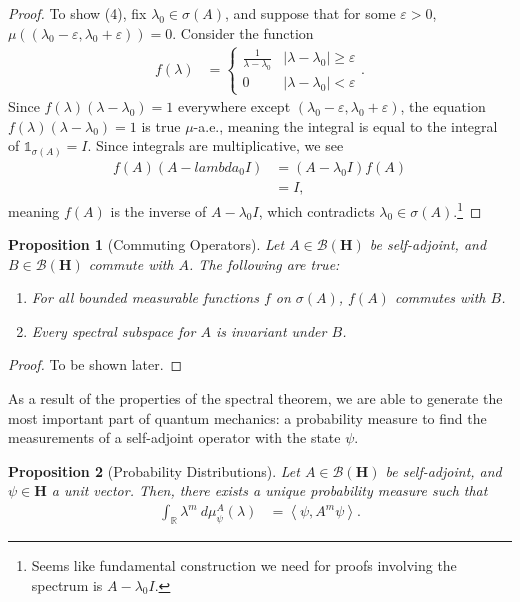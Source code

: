\documentclass[10pt]{extarticle}
\newcommand{\R}{\mathbb{R}}
\newcommand{\iprod}[2]{\left\langle #1,#2\right\rangle}
\theoremstyle{plain}
\newtheorem*{proposition}{Proposition}%
\theoremstyle{definition}
\theoremstyle{remark}
\begin{document}
\begin{proof}
    To show (4), fix $\lambda_0\in \sigma(A)$, and suppose that for some $\varepsilon > 0$, $\mu\left((\lambda_0 - \varepsilon, \lambda_0 + \varepsilon)\right) = 0$. Consider the function
    \begin{align*}
      f(\lambda) &= \begin{cases}
        \frac{1}{\lambda - \lambda_0} & \left\vert \lambda - \lambda_0 \right\vert \geq \varepsilon\\
        0 & \left\vert \lambda - \lambda_0 \right\vert < \varepsilon
      \end{cases}.
    \end{align*}
    Since $f(\lambda)\left(\lambda - \lambda_0\right) = 1$ everywhere except $(\lambda_0 - \varepsilon,\lambda_0 + \varepsilon)$, the equation $f(\lambda)\left(\lambda - \lambda_0\right) = 1$ is true $\mu$-a.e., meaning the integral is equal to the integral of $\mathbb{1}_{\sigma(A)} = I$. Since integrals are multiplicative, we see
    \begin{align*}
      f(A)\left(A - lambda_0 I\right) &= \left(A - \lambda_0 I\right)f(A)\\
                                      &= I,
    \end{align*}
    meaning $f(A)$ is the inverse of $A - \lambda_0 I$, which contradicts $\lambda_0 \in \sigma(A)$.\footnote{Seems like fundamental construction we need for proofs involving the spectrum is $A - \lambda_0 I$.}
  \end{proof}
  \begin{proposition}[Commuting Operators]
    Let $A\in \mathcal{B}\left(\mathbf{H}\right)$ be self-adjoint, and $B\in \mathcal{B}\left(\mathbf{H}\right)$ commute with $A$. The following are true:
    \begin{enumerate}[(1)]
      \item For all bounded measurable functions $f$ on $\sigma(A)$, $f(A)$ commutes with $B$.
      \item Every spectral subspace for $A$ is invariant under $B$.
    \end{enumerate}
  \end{proposition}
  \begin{proof}
    To be shown later.
  \end{proof}
  As a result of the properties of the spectral theorem, we are able to generate the most important part of quantum mechanics: a probability measure to find the measurements of a self-adjoint operator with the state $\psi$.
  \begin{proposition}[Probability Distributions]
    Let $A\in \mathcal{B}\left(\mathbf{H}\right)$ be self-adjoint, and $\psi \in \mathbf{H}$ a unit vector. Then, there exists a unique probability measure such that
    \begin{align*}
      \int_{\R}^{} \lambda^{m}\:d\mu^{A}_{\psi}(\lambda) &= \iprod{\psi}{A^{m}\psi}.
    \end{align*}
  \end{proposition}
\end{document}
